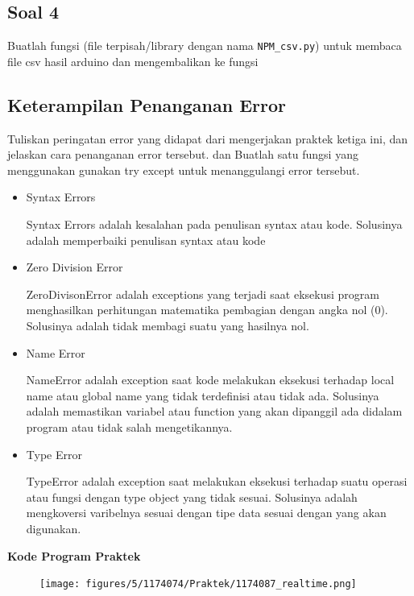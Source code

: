 \subsection{Soal 4}
Buatlah fungsi (file terpisah/library dengan nama \verb|NPM_csv.py|) untuk membaca file csv hasil arduino dan mengembalikan ke fungsi



\subsection{Keterampilan Penanganan Error}
Tuliskan peringatan error yang didapat dari mengerjakan praktek ketiga ini, dan jelaskan cara penanganan error tersebut. dan Buatlah satu fungsi yang menggunakan gunakan try except untuk menanggulangi error tersebut.
\begin{itemize}
\item Syntax Errors

Syntax Errors adalah kesalahan pada penulisan syntax atau kode. Solusinya adalah memperbaiki penulisan syntax atau kode

\item Zero Division Error

ZeroDivisonError adalah exceptions yang terjadi saat eksekusi program menghasilkan perhitungan matematika pembagian dengan angka nol (0). Solusinya adalah tidak membagi suatu yang hasilnya nol.

\item Name Error

NameError adalah exception saat kode melakukan eksekusi terhadap local name atau global name yang tidak terdefinisi atau tidak ada. Solusinya adalah memastikan variabel atau function yang akan dipanggil ada didalam program atau tidak salah mengetikannya.

\item Type Error

TypeError adalah exception saat melakukan eksekusi terhadap suatu operasi atau fungsi dengan type object yang tidak sesuai. Solusinya adalah mengkoversi varibelnya sesuai dengan tipe data sesuai dengan yang akan digunakan.

\end{itemize}



\textbf{Kode Program Praktek}
\begin{figure}[ht]
	\texttt{[image: figures/5/1174074/Praktek/1174087\_realtime.png]}
	\centering
\end{figure}

